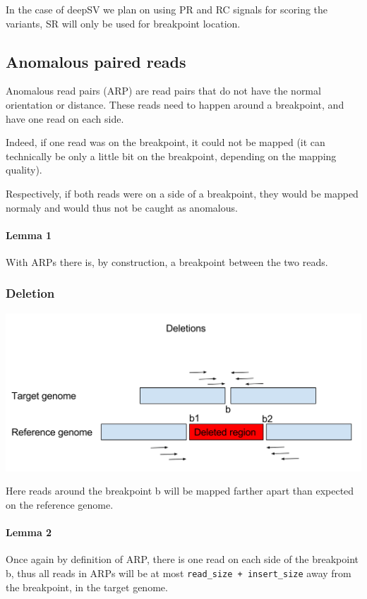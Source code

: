 \documentclass{article}
\begin{document}
In the case of deepSV we plan on using PR and RC signals for scoring the variants, SR will only
be used for breakpoint location.

\subsection{Anomalous paired reads}

Anomalous read pairs (ARP) are read pairs that do not have the normal orientation or distance.
These reads need to happen around a breakpoint, and have one read on each side.

Indeed, if one read was on the breakpoint, it could not be mapped (it can technically be only
a little bit on the breakpoint, depending on the mapping quality).

Respectively, if both reads were on a side of a breakpoint, they would be mapped normaly and would
thus not be caught as anomalous.

\paragraph{Lemma 1}  With ARPs there is, by construction, a breakpoint between the two reads.

\subsubsection{Deletion}

\includegraphics[width=\textwidth]{DeletionPairedReads}

Here reads around the breakpoint b will be mapped farther apart than expected on the reference
genome.

\paragraph{Lemma 2} Once again by definition of ARP, there is one read on each side of the breakpoint b, thus all reads in ARPs will be at most \verb|read_size + insert_size| away from the breakpoint, in the target genome.
\end{document}
